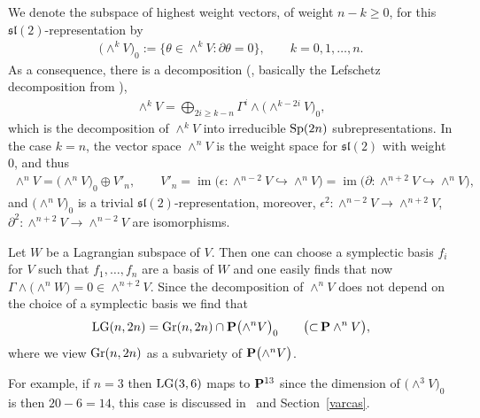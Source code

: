 \documentclass[10pt,a4paper]{amsart}
\newcommand{\PP}{{\bf P}}
\newcommand{\im}{\operatorname{im}}
\numberwithin{equation}{section}
\begin{document}
We denote the subspace of highest weight vectors, of weight $n-k\geq 0$, for this ${\mathfrak{sl}}(2)$-representation by
\begin{gather*}
\big({\wedge}^kV\big)_0 := \big\{ \theta\in\wedge^kV\colon \partial\theta = 0 \big\},\qquad k = 0,1,\ldots,n.
\end{gather*}
As a consequence, there is a decomposition (\cite[Section~11.6.7, Theorem~3]{P}, basically the Lefschetz decomposition from \cite[p.~122]{GH}),
\begin{gather*}
\wedge^kV = \bigoplus_{2i\geq k-n} \Gamma^i\wedge\big({\wedge}^{k-2i}V\big)_0,
\end{gather*}
which is the decomposition of $\wedge^kV$ into irreducible ${\rm Sp}(2n)$ subrepresentations. In the case $k=n$, the vector space $\wedge^nV$ is the weight space for ${\mathfrak{sl}}(2)$ with weight $0$, and thus
\begin{gather*}
\wedge^nV = \big({\wedge}^nV\big)_0\oplus V'_n, \qquad V'_n=\im\big(\epsilon\colon \wedge^{n-2}V\hookrightarrow\wedge^nV\big) = \im\big(\partial\colon \wedge^{n+2}V\hookrightarrow\wedge^{n}V\big),
\end{gather*}
and $\big({\wedge}^nV\big)_0$ is a trivial ${\mathfrak{sl}}(2)$-representation, moreover, $\epsilon^2\colon \wedge^{n-2}V\rightarrow\wedge^{n+2}V$, $\partial^2\colon \wedge^{n+2}V\rightarrow\wedge^{n-2}V$ are isomorphisms.

Let $W$ be a Lagrangian subspace of $V$. Then one can choose a symplectic basis $f_i$ for $V$ such that $f_1,\ldots,f_n$ are a basis of $W$ and one easily finds that now
$\Gamma\wedge\big({\wedge}^nW\big)=0\in \wedge^{n+2}V$. Since the decomposition of $\wedge^nV$ does not depend on the choice of a symplectic basis we find that
\begin{gather*}
{\rm LG}(n,2n) = {\rm Gr}(n,2n) \cap \PP\big({\wedge}^n V\big)_0\qquad\big({\subset} \,\PP \wedge^n V\big),
\end{gather*}
where we view ${\rm Gr}(n,2n)$ as a subvariety of $\PP\big({\wedge}^n V\big)$.

For example, if $n=3$ then ${\rm LG}(3,6)$ maps to $\PP^{13}$ since the dimension of $\big({\wedge}^3V\big)_0$ is then $20-6=14$, this case is discussed in~\cite{IR} and Section~\ref{varcas}.
\end{document}
